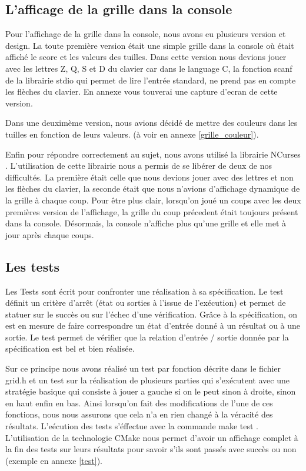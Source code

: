\documentclass[12pt]{article}
\begin{document}
\subsection{L'afficage de la grille dans la console}
Pour l'affichage de la grille dans la console, nous avons eu plusieurs version
et design. La toute premi\`ere version \'etait une simple grille dans la console
o\`u \'etait affich\'e le score et les valeurs des tuilles. Dans cette version
nous devions jouer avec les lettres Z, Q, S et D du clavier car dans le language C, la
fonction \og scanf \fg{} de la librairie \og stdio \fg{} qui permet de
lire l'entr\'ee standard, ne prend pas en compte les fl\`eches du clavier.
En annexe vous touverai une capture d'ecran de cette version.\par
Dans une deuxim\`eme version, nous avions d\'ecid\'e de mettre des couleurs dans
les tuilles en fonction de leurs valeurs. (\`a voir en annexe \ref{grille_couleur}).\par
Enfin pour r\'epondre correctement au sujet, nous avons utilis\'e la librairie
\og NCurses \fg{}. L'utilisation de cette librairie nous a permis de se
lib\'erer de deux de nos difficult\'es. La premi\`ere \'etait celle que nous devions jouer
avec des lettres et non les fl\`eches du clavier, la seconde \'etait que nous
n'avions d'affichage dynamique de la grille \`a chaque coup. Pour \^etre plus
clair, lorsqu'on jou\'e un coups avec les deux premi\`eres version de
l'affichage, la grille du coup pr\'ecedent \'etait toujours pr\'esent dans la
console. D\'esormais, la console n'affiche plus qu'une grille et elle met \`a
jour apr\`es chaque coups.

\subsection{Les tests}
Les Tests sont \'ecrit pour confronter une r\'ealisation \`a sa sp\'ecification.
Le test d\'efinit un crit\`ere d’arr\^et (\'etat ou sorties \`a l’issue de
l’ex\'ecution) et permet de statuer sur le succ\`es ou sur l’\'echec d’une
v\'erification. Gr\^ace \`a la sp\'ecification, on est en mesure de faire
correspondre un \'etat d’entr\'ee donn\'e \`a un r\'esultat ou \`a une sortie.
Le test permet de v\'erifier que la relation d’entr\'ee / sortie donn\'ee par la
sp\'ecification est bel et bien r\'ealis\'ee.
\cite{Test_unitaire}

\par Sur ce principe nous avons r\'ealis\'e un test par fonction d\'ecrite dans
le fichier \og grid.h \fg{} et un test sur la r\'ealisation de plusieurs parties
qui s'ex\'ecutent avec une strat\'egie basique qui consiste \`a jouer a gauche
si on le peut sinon \`a droite, sinon en haut enfin en bas. Ainsi lorsqu'on fait
des modifications de l'une de ces fonctions, nous nous assurons que cela n'a en
rien chang\'e \`a la v\'eracit\'e des r\'esultats. L'e\'ecution des tests
s'\'effectue avec la commande \og make test \fg{}. L'utilisation de la
technologie \og CMake \fg{} nous permet d'avoir un affichage complet \`a la fin
des tests sur leurs r\'esultats pour savoir s'ils sont pass\'es avec succ\`es
ou non (exemple en annexe \ref{test}).
\end{document}
